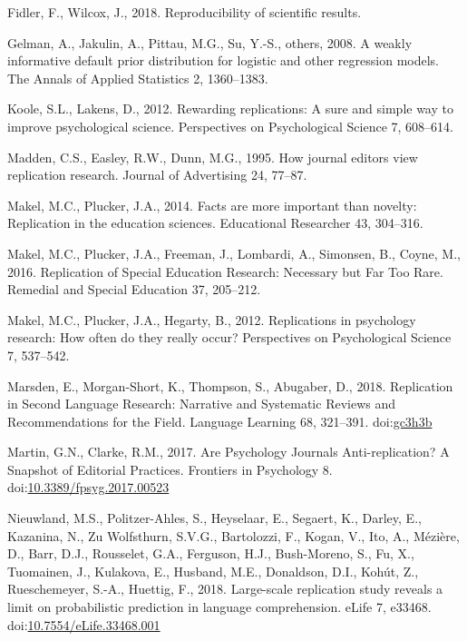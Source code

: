 \documentclass[]{elsarticle} %
\newlength{\cslhangindent}
\newlength{\cslentryspacingunit} %
\newenvironment{CSLReferences}[2] %
 {%
  \setlength{\parindent}{0pt}
  \ifodd #1
  \let\oldpar\par
  \def\par{\hangindent=\cslhangindent\oldpar}
  \fi
  \setlength{\parskip}{#2\cslentryspacingunit}
 }%
 {}
\begin{document}
\begin{CSLReferences}{1}{0}
\leavevmode{}%
Fidler, F., Wilcox, J., 2018. Reproducibility of scientific results.

\leavevmode{}%
Gelman, A., Jakulin, A., Pittau, M.G., Su, Y.-S., others, 2008. A weakly
informative default prior distribution for logistic and other regression
models. The Annals of Applied Statistics 2, 1360--1383.

\leavevmode{}%
Koole, S.L., Lakens, D., 2012. Rewarding replications: {A} sure and
simple way to improve psychological science. Perspectives on
Psychological Science 7, 608--614.

\leavevmode{}%
Madden, C.S., Easley, R.W., Dunn, M.G., 1995. How journal editors view
replication research. Journal of Advertising 24, 77--87.

\leavevmode{}%
Makel, M.C., Plucker, J.A., 2014. Facts are more important than novelty:
{Replication} in the education sciences. Educational Researcher 43,
304--316.

\leavevmode{}%
Makel, M.C., Plucker, J.A., Freeman, J., Lombardi, A., Simonsen, B.,
Coyne, M., 2016. Replication of {Special} {Education} {Research}:
{Necessary} but {Far} {Too} {Rare}. Remedial and Special Education 37,
205--212.

\leavevmode{}%
Makel, M.C., Plucker, J.A., Hegarty, B., 2012. Replications in
psychology research: {How} often do they really occur? Perspectives on
Psychological Science 7, 537--542.

\leavevmode{}%
Marsden, E., Morgan‐Short, K., Thompson, S., Abugaber, D., 2018.
Replication in {Second} {Language} {Research}: {Narrative} and
{Systematic} {Reviews} and {Recommendations} for the {Field}. Language
Learning 68, 321--391. doi:\href{https://doi.org/gc3h3b}{gc3h3b}

\leavevmode{}%
Martin, G.N., Clarke, R.M., 2017. Are {Psychology} {Journals}
{Anti}-replication? {A} {Snapshot} of {Editorial} {Practices}. Frontiers
in Psychology 8.
doi:\href{https://doi.org/10.3389/fpsyg.2017.00523}{10.3389/fpsyg.2017.00523}

\leavevmode{}%
Nieuwland, M.S., Politzer-Ahles, S., Heyselaar, E., Segaert, K., Darley,
E., Kazanina, N., Zu Wolfsthurn, S.V.G., Bartolozzi, F., Kogan, V., Ito,
A., Mézière, D., Barr, D.J., Rousselet, G.A., Ferguson, H.J.,
Bush-Moreno, S., Fu, X., Tuomainen, J., Kulakova, E., Husband, M.E.,
Donaldson, D.I., Kohút, Z., Rueschemeyer, S.-A., Huettig, F., 2018.
Large-scale replication study reveals a limit on probabilistic
prediction in language comprehension. eLife 7, e33468.
doi:\href{https://doi.org/10.7554/eLife.33468.001}{10.7554/eLife.33468.001}


\end{CSLReferences}
\end{document}
